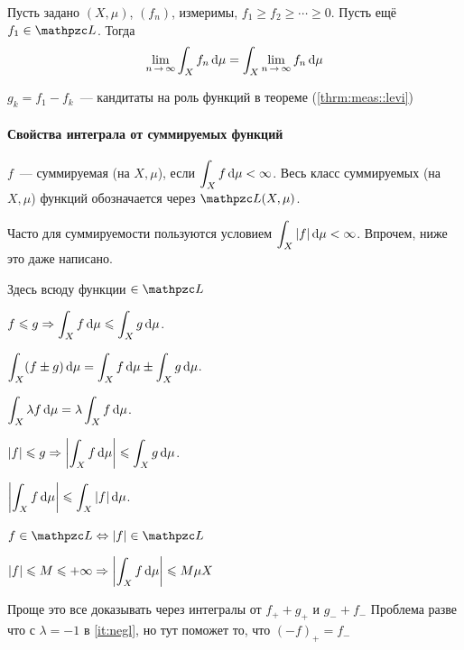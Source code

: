 \documentclass[draft, timbord]{longnotes}
\begin{document}
\begin{lem}\label{lem:meas::almev::blov}
  Пусть задано $(X,\mu)$, $(f_n)$, измеримы, $f_1 \geqslant f_2 \geqslant \cdots \geqslant 0$.
  Пусть ещё $f_1 \in \summb$. Тогда
  \[
    \lim_{n\to \infty} \int_X f_n \, \del \mu = \int_X \lim_{n\to \infty} f_n \, \del \mu 
  \]
\end{lem}
\begin{lproof}
  $g_k = f_1 - f_k$~--- кандитаты на роль функций в теореме (\ref{thrm:meas::levi})
\end{lproof}



\paragraph{Свойства интеграла от суммируемых функций}
\label{par:meas::summprop}

\begin{defn}\label{defn:meas::summprop::summ}
  $f$~--- суммируемая (на $X,\mu$), если $\displaystyle\int _X f \, \mathrm{d} \mu < \infty$.
  Весь класс суммируемых (на $X,\mu$) функций обозначается через $\summb (X,\mu)$.
\end{defn}
\begin{rem*}
  Часто для суммируемости пользуются условием $\displaystyle\int_X |f|\, \mathrm{d} \mu < \infty $.
  Впрочем, ниже это даже написано.
\end{rem*}

Здесь всюду функции $\in \summb$
\begin{enumerate}
  \item $\displaystyle
    f \leqslant g \Rightarrow \int_X f \, \mathrm{d} \mu \leqslant \int_X g \, \mathrm{d} \mu$.
  
  \item $\displaystyle
    \int_X (f \pm g)\, \mathrm{d} \mu =  \int_X f \, \mathrm{d} \mu \pm \int_X g \, \mathrm{d} \mu$.

  \item\label{it:negl} $\displaystyle
    \int_X \lambda f \, \mathrm{d} \mu =  \lambda \int_X f \, \mathrm{d} \mu$.
  
  \item $\displaystyle
    |f| \leqslant g  \Rightarrow \left| \int_X f \, \mathrm{d}\mu \right|\leqslant \int_X g \, \mathrm{d} \mu$.

  \item $\displaystyle
    \left| \int_X f \, \mathrm{d} \mu \right| \leqslant \int_X |f| \, \mathrm{d} \mu$.
  
  \item $\displaystyle
    f \in \summb \Leftrightarrow |f| \in \summb$

  \item $\displaystyle
    |f| \leqslant M \leqslant +\infty 
    \Rightarrow \left| \int_X f \, \mathrm{d}\mu \right| \leqslant M \mu X$
\end{enumerate}
Проще это все доказывать через интегралы от $f_{+} + g_{+}$ и $g_- + f_-$
Проблема разве что с $\lambda = -1$ в \ref{it:negl}, но тут поможет то, что $(-f)_+ = f_-$
\end{document}
